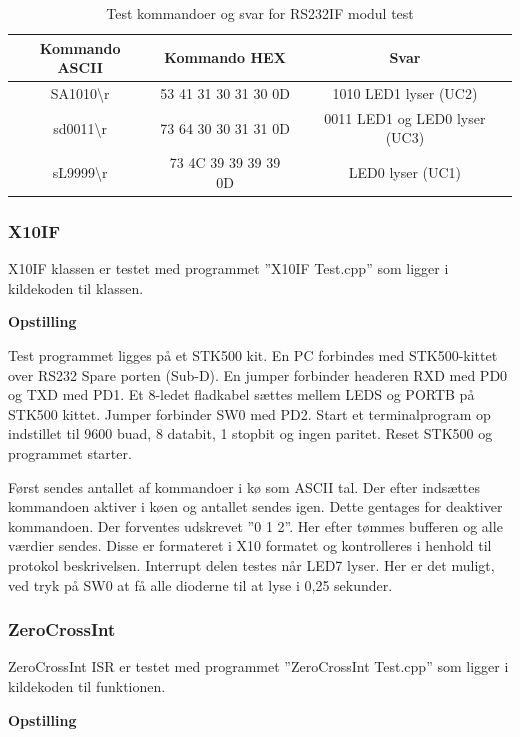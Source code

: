 \begin{table}[h]
	\caption{Test kommandoer og svar for RS232IF modul test}
	\centering
	\begin{tabular}{|c|c|c|}
		\hline 
		\textbf{Kommando ASCII} & \textbf{Kommando HEX} & \textbf{Svar} \\ 
		\hline 
		SA1010\textbackslash r & 53 41 31 30 31 30 0D & 1010 LED1 lyser (UC2) \\ 
		\hline 
		sd0011\textbackslash r & 73 64 30 30 31 31 0D & 0011 LED1 og LED0 lyser (UC3) \\ 
		\hline 
		sL9999\textbackslash r & 73 4C 39 39 39 39 0D & LED0 lyser (UC1) \\ 
		\hline 
	\end{tabular} 
	\label{table:Test_RS232IF_kommandoer}
\end{table}

\subsubsection{X10IF}
X10IF klassen er testet med programmet ''X10IF Test.cpp'' som ligger i kildekoden til klassen.

\textbf{Opstilling}

Test programmet ligges på et STK500 kit.
En PC forbindes med STK500-kittet over RS232 Spare porten (Sub-D).
En jumper forbinder headeren RXD med PD0 og TXD med PD1. Et 8-ledet fladkabel sættes mellem LEDS og PORTB på STK500 kittet. Jumper forbinder SW0 med PD2.
Start et terminalprogram op indstillet til 9600 buad, 8 databit, 1 stopbit og ingen paritet.
Reset STK500 og programmet starter.

Først sendes antallet af kommandoer i kø som ASCII tal. Der efter indsættes kommandoen aktiver i køen og antallet sendes igen. Dette gentages for deaktiver kommandoen. Der forventes udskrevet ''0 1 2''.
Her efter tømmes bufferen og alle værdier sendes. Disse er formateret i X10 formatet og kontrolleres i henhold til protokol beskrivelsen.
Interrupt delen testes når LED7 lyser. Her er det muligt, ved tryk på SW0 at få alle dioderne til at lyse i 0,25 sekunder.
 
\subsubsection{ZeroCrossInt}
ZeroCrossInt ISR er testet med programmet ''ZeroCrossInt Test.cpp'' som ligger i kildekoden til funktionen.

\textbf{Opstilling}

